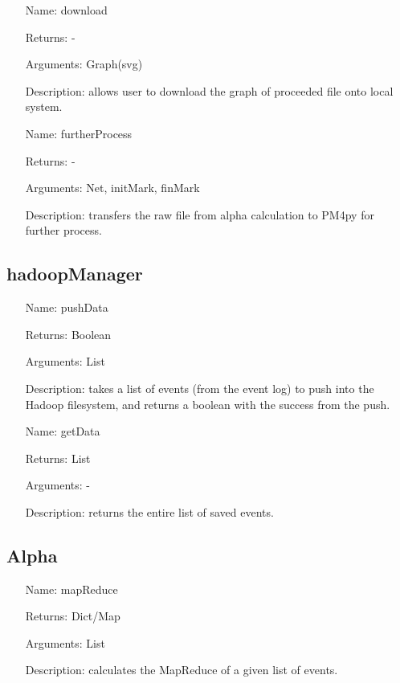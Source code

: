 \documentclass[runningheads]{llncs}
\begin{document}
\begin{itemize}
	\item[Name:] download
	\item[Returns:] -
	\item[Arguments:] Graph(svg)
	\item[Description:] allows user to download the graph of proceeded file onto local system.
\end{itemize}

\begin{itemize}
	\item[Name:] furtherProcess
	\item[Returns:] -
	\item[Arguments:] Net, initMark, finMark
	\item[Description:] transfers the raw file from alpha calculation to PM4py for further process.
\end{itemize}

\subsection{hadoopManager}
\begin{itemize}
\item[Name:] pushData
\item[Returns:] Boolean
\item[Arguments:] List
\item[Description:] takes a list of events (from the event log) to push into the Hadoop filesystem, and returns a boolean with the success from the push.
\end{itemize}

\begin{itemize}
\item[Name:] getData
\item[Returns:] List
\item[Arguments:] -
\item[Description:] returns the entire list of saved events.
\end{itemize}

\subsection{Alpha}
\begin{itemize}
\item[Name:] mapReduce
\item[Returns:] Dict/Map
\item[Arguments:] List
\item[Description:] calculates the MapReduce of a given list of events.
\end{itemize}
\end{document}

